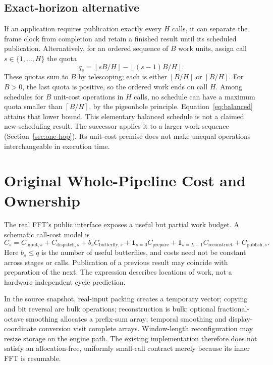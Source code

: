\documentclass[11pt,letterpaper]{article}
\newcommand{\ceil}[1]{\left\lceil #1\right\rceil}
\newcommand{\floor}[1]{\left\lfloor #1\right\rfloor}
\begin{document}
\subsection{Exact-horizon alternative}
If an application requires publication exactly every $H$ calls, it can separate
the frame clock from completion and retain a finished result until its scheduled
publication. Alternatively, for an ordered sequence of $B$ work units, assign
call $s\in\{1,\ldots,H\}$ the quota
\begin{equation}
 q_s=\floor{sB/H}-\floor{(s-1)B/H}.
 \label{eq:balanced}
\end{equation}
These quotas sum to $B$ by telescoping; each is either $\floor{B/H}$ or
$\ceil{B/H}$. For $B>0$, the last quota is positive, so the ordered work ends
on call $H$. Among schedules for $B$ unit-cost operations in $H$ calls, no
schedule can have a maximum quota smaller than $\ceil{B/H}$, by the pigeonhole
principle. Equation~\eqref{eq:balanced} attains that lower bound. This elementary
balanced schedule is not a claimed new scheduling result. The successor applies
it to a larger work sequence (Section~\ref{sec:one-hop}). Its unit-cost premise
does not make unequal operations interchangeable in execution time.

\section{Original Whole-Pipeline Cost and Ownership}
\label{sec:cost}
The real FFT's public interface exposes a useful but partial work budget.
A schematic call-cost model is
\begin{equation}
 C_s=C_{\mathrm{input},s}+C_{\mathrm{dispatch},s}
       +b_s C_{\mathrm{butterfly},s}
       +\mathbf{1}_{s=0}C_{\mathrm{prepare}}
       +\mathbf{1}_{s=L-1}C_{\mathrm{reconstruct}}
       +C_{\mathrm{publish},s}.
 \label{eq:cost}
\end{equation}
Here $b_s\le q$ is the number of useful butterflies, and costs need not be
constant across stages or calls. Publication of a previous result may coincide
with preparation of the next. The expression describes locations of work,
not a hardware-independent cycle prediction.

In the source snapshot, real-input packing creates a temporary vector;
copying and bit reversal are bulk operations; reconstruction is bulk; optional
fractional-octave smoothing allocates a prefix-sum array; temporal smoothing
and display-coordinate conversion visit complete arrays. Window-length
reconfiguration may resize storage on the engine path. The existing
implementation therefore does not satisfy an allocation-free, uniformly
small-call contract merely because its inner FFT is resumable.
\end{document}
